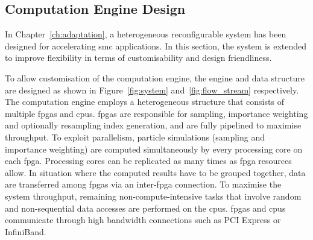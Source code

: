 \subsection{Computation Engine Design}
\label{sec:flow_system}

In Chapter~\ref{ch:adaptation}, a heterogeneous reconfigurable system has been designed for accelerating \gls{smc} applications.
In this section, the system is extended to improve flexibility in terms of customisability and design friendliness.

To allow customisation of the computation engine, the engine and data structure are designed as shown in Figure~\ref{fig:system} and~\ref{fig:flow_stream} respectively.
The computation engine employs a heterogeneous structure that consists of multiple \glspl{fpga} and \glspl{cpu}.
\glspl{fpga} are responsible for sampling, importance weighting and optionally resampling index generation, and are fully pipelined to maximise throughput. 
To exploit parallelism, particle simulations (sampling and importance weighting) are computed simultaneously by every processing core on each \gls{fpga}. 
Processing cores can be replicated as many times as \gls{fpga} resources allow.
In situation where the computed results have to be grouped together, data are transferred among \glspl{fpga} via an inter-\gls{fpga} connection.
To maximise the system throughput, remaining non-compute-intensive tasks that involve random and non-sequential data accesses are performed on the \glspl{cpu}.
\glspl{fpga} and \glspl{cpu} communicate through high bandwidth connections such as PCI Express or InfiniBand.

